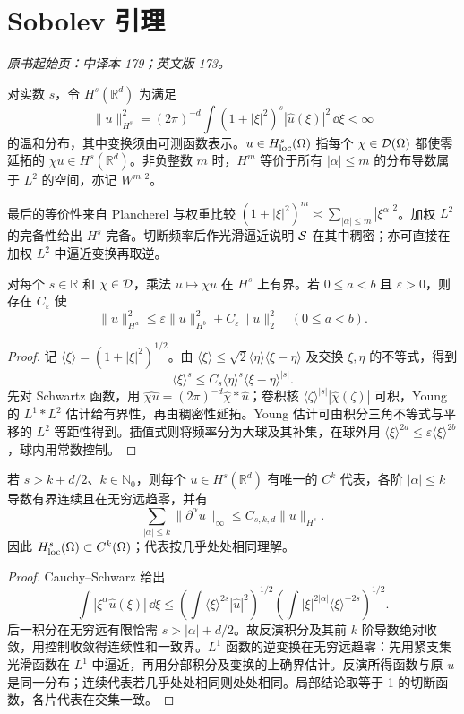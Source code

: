 \section{Sobolev 引理}\label{sec:yosida-06-07}
\noindent\textit{原书起始页：中译本 179；英文版 173。}

\begin{definition}
对实数 $s$，令 $H^s(\mathbb R^d)$ 为满足
\[
 \|u\|_{H^s}^2=(2\pi)^{-d}\int(1+|\xi|^2)^s|\widehat u(\xi)|^2\,\dd\xi<\infty
\]
的温和分布，其中变换须由可测函数表示。$u\in H^s_{\mathrm{loc}}(\Omega)$ 指每个 $\chi\in\mathcal{D}(\Omega)$ 都使零延拓的 $\chi u\in H^s(\mathbb R^d)$。非负整数 $m$ 时，$H^m$ 等价于所有 $|\alpha|\le m$ 的分布导数属于 $L^2$ 的空间，亦记 $W^{m,2}$。
\end{definition}

最后的等价性来自 Plancherel 与权重比较
$(1+|\xi|^2)^m\asymp\sum_{|\alpha|\le m}|\xi^\alpha|^2$。加权 $L^2$ 的完备性给出 $H^s$ 完备。切断频率后作光滑逼近说明 $\mathcal{S}$ 在其中稠密；亦可直接在加权 $L^2$ 中逼近变换再取逆。

\begin{lemma}[切断乘子与插值估计]\label{lem:y6-sobolev-cutoff}
对每个 $s\in\mathbb R$ 和 $\chi\in\mathcal{D}$，乘法 $u\mapsto\chi u$ 在 $H^s$ 上有界。若 $0\le a<b$ 且 $\varepsilon>0$，则存在 $C_\varepsilon$ 使
\[
 \|u\|_{H^a}^2\le\varepsilon\|u\|_{H^b}^2+C_\varepsilon\|u\|_2^2
 \quad(0\le a<b).
\]
\end{lemma}
\begin{proof}
记 $\langle\xi\rangle=(1+|\xi|^2)^{1/2}$。由 $\langle\xi\rangle\le\sqrt2\langle\eta\rangle\langle\xi-\eta\rangle$ 及交换 $\xi,\eta$ 的不等式，得到
\[
 \langle\xi\rangle^s\le C_s\langle\eta\rangle^s\langle\xi-\eta\rangle^{|s|}.
\]
先对 Schwartz 函数，用 $\widehat{\chi u}=(2\pi)^{-d}\widehat\chi*\widehat u$；卷积核 $\langle\zeta\rangle^{|s|}|\widehat\chi(\zeta)|$ 可积，Young 的 $L^1*L^2$ 估计给有界性，再由稠密性延拓。Young 估计可由积分三角不等式与平移的 $L^2$ 等距性得到。插值式则将频率分为大球及其补集，在球外用 $\langle\xi\rangle^{2a}\le\varepsilon\langle\xi\rangle^{2b}$，球内用常数控制。
\end{proof}

\begin{theorem}[Sobolev 引理]\label{thm:y6-sobolev}
若 $s>k+d/2$、$k\in\mathbb N_0$，则每个 $u\in H^s(\mathbb R^d)$ 有唯一的 $C^k$ 代表，各阶 $|\alpha|\le k$ 导数有界连续且在无穷远趋零，并有
\[
 \sum_{|\alpha|\le k}\|\partial^\alpha u\|_\infty\le C_{s,k,d}\|u\|_{H^s}.
\]
因此 $H^s_{\mathrm{loc}}(\Omega)\subset C^k(\Omega)$；代表按几乎处处相同理解。
\end{theorem}
\begin{proof}
Cauchy--Schwarz 给出
\[
 \int|\xi^\alpha\widehat u(\xi)|\,\dd\xi
 \le\left(\int\langle\xi\rangle^{2s}|\widehat u|^2\right)^{1/2}
 \left(\int|\xi|^{2|\alpha|}\langle\xi\rangle^{-2s}\right)^{1/2}.
\]
后一积分在无穷远有限恰需 $s>|\alpha|+d/2$。故反演积分及其前 $k$ 阶导数绝对收敛，用控制收敛得连续性和一致界。$L^1$ 函数的逆变换在无穷远趋零：先用紧支集光滑函数在 $L^1$ 中逼近，再用分部积分及变换的上确界估计。反演所得函数与原 $u$ 是同一分布；连续代表若几乎处处相同则处处相同。局部结论取等于 1 的切断函数，各片代表在交集一致。
\end{proof}

